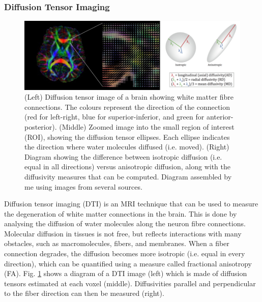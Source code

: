 \subsubsection{Diffusion Tensor Imaging}
\label{sec:bckDti}

\begin{figure}
\centering
\includegraphics[width=1.0\textwidth]{images/DTI_diagram}
\caption[Diffusion tensor image diagram]{(Left) Diffusion tensor image of a brain showing white matter fibre connections. The colours represent the direction of the connection (red for left-right, blue for superior-inferior, and green for anterior-posterior). (Middle) Zoomed image into the small region of interest (ROI), showing the diffusion tensor ellipses. Each ellipse indicates the direction where water molecules diffused (i.e. moved). (Right) Diagram showing the difference between isotropic diffusion (i.e. equal in all directions) versus anisotropic diffusion, along with the diffusivity measures that can be computed. Diagram assembled by me using images from several sources\footnotemark.}
\label{fig:bckDtiDiagram}
\end{figure}

Diffusion tensor imaging (DTI) is an MRI technique that can be used to measure the degeneration of white matter connections in the brain. This is done by analysing the diffusion of water molecules along the neuron fibre connections. Molecular diffusion in tissues is not free, but reflects interactions with many obstacles, such as macromolecules, fibers, and membranes. When a fiber connection degrades, the diffusion becomes more isotropic (i.e. equal in every direction), which can be quantified using a measure called fractional anisotropy (FA). Fig. \ref{fig:bckDtiDiagram} shows a diagram of a DTI image (left) which is made of diffusion tensors estimated at each voxel (middle). Diffusivities parallel and perpendicular to the fiber direction can then be measured (right).   

